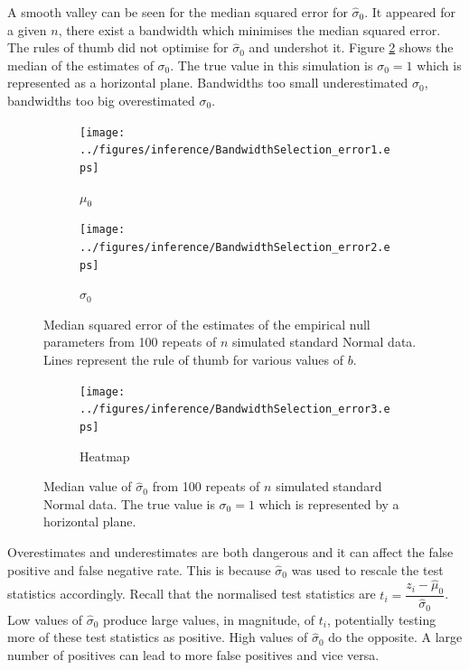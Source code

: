A smooth valley can be seen for the median squared error for $\widehat{\sigma}_0$. It appeared for a given $n$, there exist a bandwidth which minimises the median squared error. The rules of thumb did not optimise for $\widehat{\sigma}_0$ and undershot it. Figure \ref{fig:inference_BandwidthSelection_error3} shows the median of the estimates of $\sigma_0$. The true value in this simulation is $\sigma_0=1$ which is represented as a horizontal plane. Bandwidths too small underestimated $\sigma_0$, bandwidths too big overestimated $\sigma_0$.

\begin{figure}
  \centering
  \begin{subfigure}[b]{\subSize}
      \texttt{[image: ../figures/inference/BandwidthSelection\_error1.eps]}
      \caption{$\mu_0$}
  \end{subfigure}
  \begin{subfigure}[b]{\subSize}
      \texttt{[image: ../figures/inference/BandwidthSelection\_error2.eps]}
      \caption{$\sigma_0$}
  \end{subfigure}
  \caption{Median squared error of the estimates of the empirical null parameters from 100 repeats of $n$ simulated standard Normal data. Lines represent the rule of thumb for various values of $b$.}
  \label{fig:inference_BandwidthSelection_error}
\end{figure}

\begin{figure}
  \centering
    \begin{subfigure}[b]{\subSize}
        \texttt{[image: ../figures/inference/BandwidthSelection\_error3.eps]}
        \caption{Heatmap}
    \end{subfigure}
    \caption{Median value of $\widehat{\sigma}_0$ from 100 repeats of $n$ simulated standard Normal data. The true value is $\sigma_0=1$ which is represented by a horizontal plane.}
    \label{fig:inference_BandwidthSelection_error3}
\end{figure}

Overestimates and underestimates are both dangerous and it can affect the false positive and false negative rate. This is because $\widehat{\sigma}_0$ was used to rescale the test statistics accordingly. Recall that the normalised test statistics are $t_i = \dfrac{z_i - \widehat{\mu}_0}{\widehat{\sigma}_0}$. Low values of $\widehat{\sigma}_0$ produce large values, in magnitude, of $t_i$, potentially testing more of these test statistics as positive. High values of $\widehat{\sigma}_0$ do the opposite. A large number of positives can lead to more false positives and vice versa.

